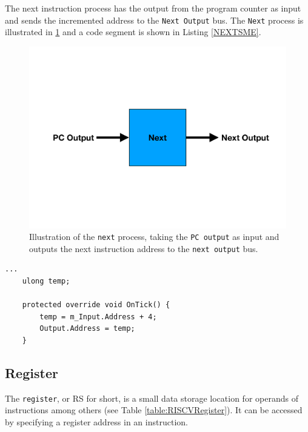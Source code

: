         The next instruction process has the output from the program counter as input and sends the incremented address to the \texttt{Next Output} bus. The \texttt{Next} process is illustrated in \ref{fig:NEXT} and a code segment is shown in Listing \ref{NEXTSME}.
        
        \begin{figure}[h!]
            \centering
            \includegraphics[scale=0.34]{pictures/Next.pdf}
            \caption{Illustration of the \texttt{next} process, taking the \texttt{PC output} as input and outputs the next instruction address to the \texttt{next output} bus.}
            \label{fig:NEXT}
        \end{figure}
    
        \begin{minipage}{\linewidth}
            \begin{lstlisting}[language={[Sharp]C}, caption={A slice of the \texttt{Next} process SME code. Here we declare a temporary varible, which contains the program counter output. We increment the temporary variable by four and place it in the output bus.},captionpos=b, label = NEXTSME]
...
    ulong temp;
    
    protected override void OnTick() {
        temp = m_Input.Address + 4;
        Output.Address = temp;
    }
            \end{lstlisting}
        \end{minipage}  
        
    
    \subsection{Register}
        The \texttt{register}, or RS for short, is a small data storage location for operands of instructions among others (see Table \ref{table:RISCVRegister}). It can be accessed by specifying a register address in an instruction. 
        
